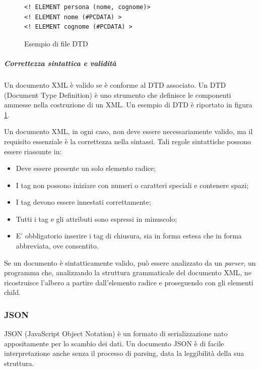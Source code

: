 \begin{figure}[h]
\lstset{language=MYXML}
\begin{lstlisting}
<! ELEMENT persona (nome, cognome)>
<! ELEMENT nome (#PCDATA) >
<! ELEMENT cognome (#PCDATA) >
\end{lstlisting}
\caption{Esempio di file DTD\label{dtdimage}}
\end{figure}

\subparagraph{Correttezza sintattica e validità}
Un documento XML è valido se è conforme al DTD associato.
Un DTD (Document Type Definition) è uno strumento che definisce le componenti ammesse nella costruzione di un XML. Un esempio di DTD è riportato in figura \ref{dtdimage}.





Un documento XML, in ogni caso, non deve essere necessariamente valido, ma il requisito essenziale è la correttezza nella sintassi.
Tali regole sintattiche possono essere riassunte in:
\begin{itemize}
\item Deve essere presente un solo elemento radice;
\item I tag non possono iniziare con numeri o caratteri speciali e contenere spazi;
\item I tag devono essere innestati correttamente;
\item Tutti i tag e gli attributi sono espressi in minuscolo;
\item E' obbligatorio inserire i tag di chiusura, sia in forma estesa che in forma abbreviata, ove consentito.
\end{itemize}
Se un documento è sintatticamente valido, può essere analizzato da un \textit{parser}, un programma che, analizzando la struttura grammaticale del documento XML, ne ricostruisce l'albero a partire dall'elemento radice e proseguendo con gli elementi child.


\subsubsection{JSON}
JSON (JavaScript Object Notation) è un formato di serializzazione nato appositamente per lo scambio dei dati.
Un documento JSON è di facile interpretazione anche senza il processo di parsing, data la leggibilità della sua struttura.


